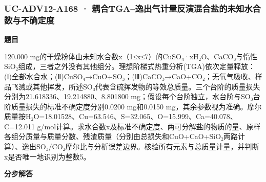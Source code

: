 \documentclass[UTF8,11pt,a4paper]{ctexart}
\begin{document}
\subsubsection*{UC-ADV12-A168 · 耦合TGA–逸出气计量反演混合盐的未知水合数与不确定度}
\noindent\textbf{题目}\par
120.000 mg的干燥粉体由未知水合数x（1≤x≤7）的CuSO₄·xH₂O、CaCO₃与惰性SiO₂组成，三者之外没有其他组分。理想阶梯式热重分析(TGA)依次定量释放：(Ⅰ)全部水合水；(Ⅱ)CuSO₄→CuO+SO₃；(Ⅲ)CaCO₃→CaO+CO₂；无氧气吸收、样品飞溅或其他挥发，所述SO₃代表含硫挥发物的等效总质量。三个台阶的质量损失分别为21.618336、19.214880、8.801800 mg；假设每个台阶独立，水台阶与SO₃台阶质量损失的标准不确定度分别0.0200 mg和0.0150 mg，其余参数视为准确。摩尔质量按H₂O=18.01528、Cu=63.546、S=32.065、O=15.999、Ca=40.078、C=12.011 g/mol计算。求水合数x及标准不确定度、两可分解盐的物质的量、原样各组分质量与质量分数、残渣质量（分别由总损失和CuO+CaO+SiO₂两路计算）、逸出SO₃/CO₂摩尔比与分析误差边界。核验所有元素与总质量计量，并判断x是否唯一地识别为整数5。\par
\medskip\noindent\textbf{分步解答}
\end{document}
